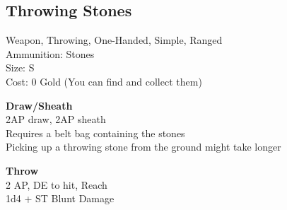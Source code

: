\subsection{Throwing Stones}\label{weapon:throwingStones}
Weapon, Throwing, One-Handed, Simple, Ranged\\
Ammunition: Stones\\
Size: S\\
Cost: 0 Gold (You can find and collect them)

\textbf{Draw/Sheath}\\
2AP draw, 2AP sheath\\
Requires a belt bag containing the stones\\
Picking up a throwing stone from the ground might take longer

\textbf{Throw}\\
2 AP, DE to hit,  Reach\\
1d4 + \texttimes ST Blunt Damage

